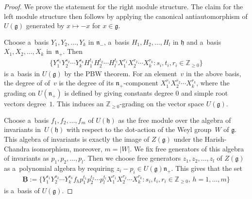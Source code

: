 \documentclass[pdftex]{sigma}
\begin{document}
\begin{proof}
We prove the statement for the right module structure.
The claim for the left module structure then follows by applying the canonical antiautomorphism of $U(\mathfrak{g})$
generated by $x\mapsto -x$ for $x\in \mathfrak{g}$.

Choose a~basis $Y_1,Y_2,\dots,Y_k$ in $\mathfrak{n}_-$, a~basis $H_1,H_2,\dots,H_l$ in $\mathfrak{h}$ and a~basis
$X_1,X_2,\dots,X_k$ in~$\mathfrak{n}_+$.
Then
\begin{gather}
\label{eq33}
\big\{Y_1^{s_1}Y_2^{s_2}\cdots Y_k^{s_k}H_1^{t_1}H_2^{t_2}\cdots H_l^{t_l}X_1^{r_1}X_2^{r_2}\cdots X_k^{r_k}:
s_i,t_i,r_i\in\mathbb{Z}_{\geq0}\big\}
\end{gather}
is a~basis in $U(\mathfrak{g})$ by the PBW theorem.
For an element~$v$ in the above basis, the degree of of~$v$ is the degree of its $\mathfrak{n}_+$-component
$X_1^{r_1}X_2^{r_2}\cdots X_k^{r_k}$, where the grading on $U(\mathfrak{n}_+)$ is def\/ined by giving constants degree $0$
and simple root vectors degree~$1$.
This induces an $\mathbb{Z}_{\geq 0}$-grading on the vector space $U(\mathfrak{g})$.

Choose a~basis $f_1,f_2,\dots,f_m$ of $U(\mathfrak{h})$ as the free module over the algebra of invariants in~$U(\mathfrak{h})$ with respect to the dot-action of the Weyl group~$W$ of $\mathfrak{g}$.
This algebra of invariants is exactly the image of $Z(\mathfrak{g})$ under the Harish-Chandra isomorphism, moreover,
$m=|W|$.
We f\/ix free generators of this algebra of invariants as $p_1,p_2,\dots, p_l$.
Then we choose free generators $z_1,z_2,\dots,z_l$ of $Z(\mathfrak{g})$ as a~polynomial algebra by requiring $z_i-p_i\in
U(\mathfrak{g})\mathfrak{n}_{+}$.
This gives that the set
\begin{gather*}
\underline{\mathbf{B}}:=\big\{Y_1^{s_1}Y_2^{s_2}\cdots Y_k^{s_k} f_hp_1^{t_1}p_2^{t_2}\cdots p_l^{t_l} X_1^{r_1}X_2^{r_2}\cdots
X_k^{r_k}: s_i,t_i,r_i\in\mathbb{Z}_{\geq0},\, h=1,\dots,m\big\}
\end{gather*}
is a~basis of $U(\mathfrak{g})$.


\end{proof}
\end{document}
